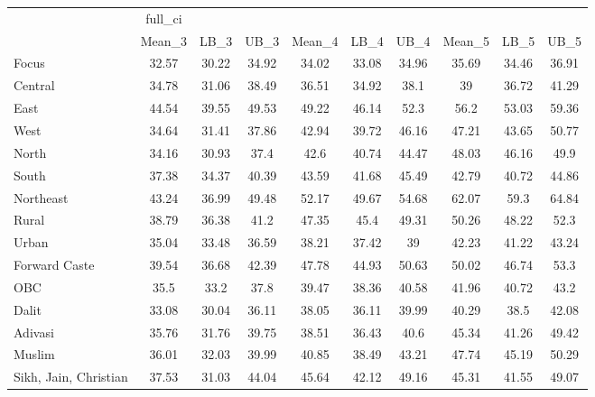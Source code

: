 \begin{tabular}{l*{9}{c}}
\hline\hline
            &     full\_ci&            &            &            &            &            &            &            &            \\
            &      Mean\_3&        LB\_3&        UB\_3&      Mean\_4&        LB\_4&        UB\_4&      Mean\_5&        LB\_5&        UB\_5\\
\hline
Focus       &       32.57&       30.22&       34.92&       34.02&       33.08&       34.96&       35.69&       34.46&       36.91\\
Central     &       34.78&       31.06&       38.49&       36.51&       34.92&        38.1&          39&       36.72&       41.29\\
East        &       44.54&       39.55&       49.53&       49.22&       46.14&        52.3&        56.2&       53.03&       59.36\\
West        &       34.64&       31.41&       37.86&       42.94&       39.72&       46.16&       47.21&       43.65&       50.77\\
North       &       34.16&       30.93&        37.4&        42.6&       40.74&       44.47&       48.03&       46.16&        49.9\\
South       &       37.38&       34.37&       40.39&       43.59&       41.68&       45.49&       42.79&       40.72&       44.86\\
Northeast   &       43.24&       36.99&       49.48&       52.17&       49.67&       54.68&       62.07&        59.3&       64.84\\
Rural       &       38.79&       36.38&        41.2&       47.35&        45.4&       49.31&       50.26&       48.22&        52.3\\
Urban       &       35.04&       33.48&       36.59&       38.21&       37.42&          39&       42.23&       41.22&       43.24\\
Forward Caste&       39.54&       36.68&       42.39&       47.78&       44.93&       50.63&       50.02&       46.74&        53.3\\
OBC         &        35.5&        33.2&        37.8&       39.47&       38.36&       40.58&       41.96&       40.72&        43.2\\
Dalit       &       33.08&       30.04&       36.11&       38.05&       36.11&       39.99&       40.29&        38.5&       42.08\\
Adivasi     &       35.76&       31.76&       39.75&       38.51&       36.43&        40.6&       45.34&       41.26&       49.42\\
Muslim      &       36.01&       32.03&       39.99&       40.85&       38.49&       43.21&       47.74&       45.19&       50.29\\
Sikh, Jain, Christian&       37.53&       31.03&       44.04&       45.64&       42.12&       49.16&       45.31&       41.55&       49.07\\
\hline\hline
\end{tabular}
